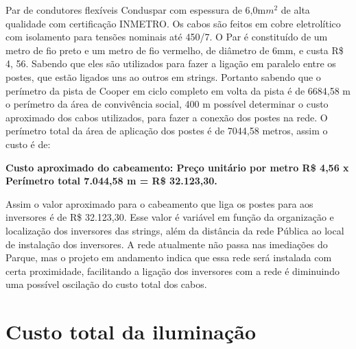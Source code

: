Par de condutores flex\'iveis Conduspar com espessura de 6,0m$m^{2}$ de alta qualidade com certifica\c{c}\~ao INMETRO. Os cabos s\~ao feitos em cobre eletrol\'itico com isolamento para tens\~oes nominais at\'e 450/7.\cite{NEOSOLARCASASOLAR}
O Par \'e constitu\'ido de um metro de  fio preto e um metro de fio vermelho, de di\^ametro de 6mm, e custa R\$ 4, 56. Sabendo que eles s\~ao utilizados para fazer a liga\c{c}\~ao em paralelo entre os postes, que est\~ao ligados uns ao outros em strings. Portanto sabendo que o per\'imetro da pista de Cooper em ciclo completo em volta da pista \'e de 6684,58 m o per\'imetro da \'area de conviv\^encia social, 400 m poss\'ivel determinar o custo aproximado dos cabos utilizados, para fazer a conex\~ao dos postes na rede. O per\'imetro total da \'area de aplica\c{c}\~ao dos postes \'e de 7044,58 metros, assim o custo \'e de:

	\textbf{Custo aproximado do cabeamento: Pre\c{c}o unit\'ario por metro R\$ 4,56 x Per\'imetro total  7.044,58 m  =  R\$ 32.123,30.}
	
	Assim o valor aproximado para o cabeamento que liga os postes para aos inversores \'e de R\$ 32.123,30. Esse valor \'e vari\'avel em fun\c{c}\~ao da organiza\c{c}\~ao e localiza\c{c}\~ao dos inversores das strings, al\'em da dist\^ancia da rede P\'ublica ao local de instala\c{c}\~ao dos inversores. A rede atualmente n\~ao passa nas imedia\c{c}\~oes do Parque, mas o projeto em andamento indica que essa rede ser\'a instalada com certa proximidade, facilitando a liga\c{c}\~ao dos inversores com a rede \'e diminuindo uma poss\'ivel oscila\c{c}\~ao do custo total dos cabos.
	
\section{Custo total da ilumina\c{c}\~ao}


